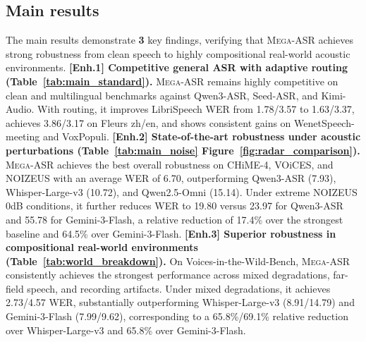 \documentclass{llmxive}
\begin{document}
\subsection{Main results}
The main results demonstrate \textbf{3} key findings, verifying that \textsc{Mega-ASR} achieves strong robustness from clean speech to highly compositional real-world acoustic environments. \textbf{[Enh.1] Competitive general ASR with adaptive routing (Table~\ref{tab:main_standard}).} \textsc{Mega-ASR} remains highly competitive on clean and multilingual benchmarks against Qwen3-ASR, Seed-ASR, and Kimi-Audio. With routing, it improves LibriSpeech WER from 1.78/3.57 to 1.63/3.37, achieves 3.86/3.17 on Fleurs zh/en, and shows consistent gains on WenetSpeech-meeting and VoxPopuli. \textbf{[Enh.2] State-of-the-art robustness under acoustic perturbations (Table~\ref{tab:main_noise} Figure~\ref{fig:radar_comparison}).} \textsc{Mega-ASR} achieves the best overall robustness on CHiME-4, VOiCES, and NOIZEUS with an average WER of 6.70, outperforming Qwen3-ASR (7.93), Whisper-Large-v3 (10.72), and Qwen2.5-Omni (15.14). Under extreme NOIZEUS 0dB conditions, it further reduces WER to 19.80 versus 23.97 for Qwen3-ASR and 55.78 for Gemini-3-Flash, a relative reduction of 17.4\% over the strongest baseline and 64.5\% over Gemini-3-Flash. \textbf{[Enh.3] Superior robustness in compositional real-world environments (Table~\ref{tab:world_breakdown}).} On Voices-in-the-Wild-Bench, \textsc{Mega-ASR} consistently achieves the strongest performance across mixed degradations, far-field speech, and recording artifacts. Under mixed degradations, it achieves 2.73/4.57 WER, substantially outperforming Whisper-Large-v3 (8.91/14.79) and Gemini-3-Flash (7.99/9.62), corresponding to a 65.8\%/69.1\% relative reduction over Whisper-Large-v3 and 65.8\% over Gemini-3-Flash.
\end{document}
